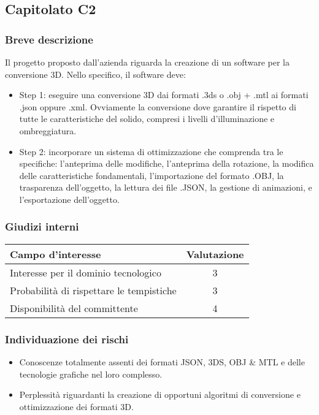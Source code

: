 \subsection{Capitolato C2}
\subsubsection{Breve descrizione}
Il progetto proposto dall'azienda  riguarda la creazione di un software per la conversione 3D. Nello specifico, il software deve:
\begin{itemize}
	\item Step 1: eseguire una conversione 3D dai formati .3ds o .obj + .mtl ai formati .json oppure .xml. Ovviamente la conversione dove garantire il rispetto di tutte le caratteristiche del solido, compresi i livelli d'illuminazione e ombreggiatura.
	\item Step 2: incorporare un sistema di ottimizzazione che comprenda tra le specifiche: l'anteprima delle modifiche, l'anteprima della rotazione, la modifica delle caratteristiche fondamentali, l'importazione del formato  .OBJ, la trasparenza dell'oggetto, la lettura dei file .JSON, la gestione di animazioni, e l'esportazione dell'oggetto.
\end{itemize}
\subsubsection{Giudizi interni}
\begin{center}
\begin{tabular}{lc}
\toprule
Campo d'interesse & Valutazione\\
\midrule %
Interesse per il dominio tecnologico & 3\\
Probabilità di rispettare le tempistiche & 3\\
Disponibilità del committente & 4\\
\bottomrule
\end{tabular}
\end{center}
\subsubsection{Individuazione dei rischi}
\begin{itemize}
	\item Conoscenze totalmente assenti dei formati JSON, 3DS, OBJ \& MTL e delle tecnologie grafiche nel loro complesso.
	\item Perplessità riguardanti la creazione di opportuni algoritmi di conversione e ottimizzazione dei formati 3D.
\end{itemize}
